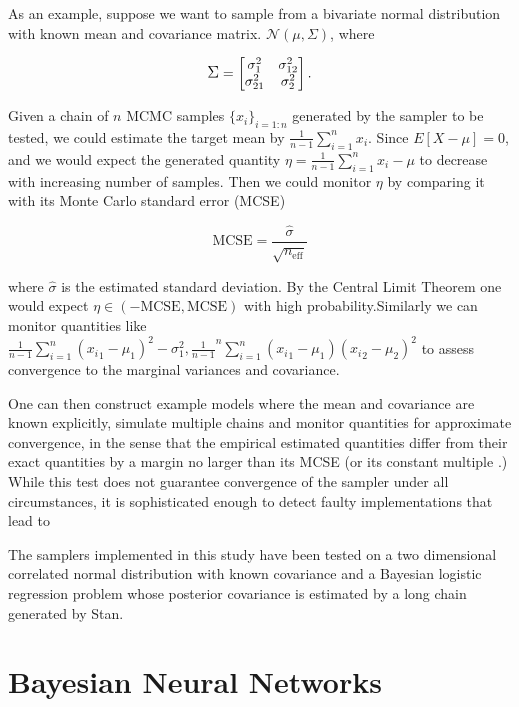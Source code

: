 \documentclass[12pt]{report}
\begin{document}
As an example, suppose we want to sample from a bivariate normal distribution with known mean and covariance matrix. $\mathcal{N}(\mu,\Sigma) $, where 

\begin{displaymath}
\mathlarger{\Sigma} = 
\begin{bmatrix}
\sigma^2_1 &\sigma_{12}^2 \\
\sigma_{21}^2 &\sigma^2_2 \\
\end{bmatrix}.
\end{displaymath}

Given a chain of $n$ MCMC samples $\{x_i\}_{i=1:n}$ generated by the sampler to be tested, we could estimate  the target mean by $ \frac{1}{n-1} \sum_{i=1}^ n x_i$. Since $E[X-\mu] = 0$, and we would expect the generated quantity $\eta= \frac{1}{n-1} \sum_{i=1}^ n x_i -\mu$ to decrease with increasing number of samples. Then we could monitor $\eta$ by comparing it with its Monte Carlo standard error (MCSE) 

\[ \text{MCSE} = \frac{\hat{\sigma}}{\sqrt{n_{\text{eff}}}} \]

where $\hat{\sigma}$ is the estimated standard deviation. By the Central Limit Theorem one would expect  $\eta \in (-\text{MCSE},\text{MCSE})$ with high probability.Similarly we can monitor quantities like $\frac{1}{n-1} \sum_{i=1}^n ({x_i}_1 -\mu_1)^2 - \sigma^2_1,  \frac{1}{n-1}^n \sum_{i=1}^n ({x_i}_1 - \mu_1)({x_i}_2 - \mu_2)^2 $ to assess convergence to the marginal variances and covariance.

One can then construct example models where the mean and covariance are known explicitly, simulate multiple chains and monitor quantities for approximate convergence, in the sense that the empirical estimated quantities differ from their exact quantities by a margin no larger than its MCSE (or its constant multiple .) While this test does not guarantee convergence of the sampler under all circumstances, it is sophisticated enough to detect faulty implementations that lead to 

The samplers implemented in this study have been tested on a two dimensional correlated normal distribution with known covariance and a Bayesian logistic regression problem whose posterior covariance is estimated by a long chain generated by Stan.

\chapter{Bayesian Neural Networks}
\end{document}
